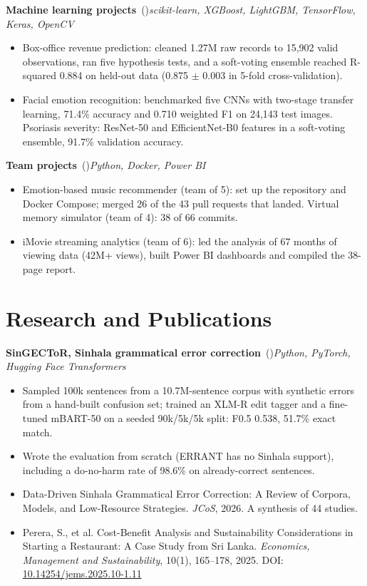 \documentclass[10pt,a4paper]{article}
\newcommand{\project}[3]{%
  \textbf{#1}\ifx\relax#3\relax\else\ (#3)\fi\hfill{\itshape #2}\par
}
\begin{document}
\project{Machine learning projects}{scikit-learn, XGBoost, LightGBM, TensorFlow, Keras, OpenCV}{}
\begin{itemize}
  \item Box-office revenue prediction: cleaned 1.27M raw records to 15,902 valid observations, ran five hypothesis tests, and a soft-voting ensemble reached R-squared 0.884 on held-out data (0.875 $\pm$ 0.003 in 5-fold cross-validation).
  \item Facial emotion recognition: benchmarked five CNNs with two-stage transfer learning, 71.4\% accuracy and 0.710 weighted F1 on 24,143 test images. Psoriasis severity: ResNet-50 and EfficientNet-B0 features in a soft-voting ensemble, 91.7\% validation accuracy.
\end{itemize}
\project{Team projects}{Python, Docker, Power BI}{}
\begin{itemize}
  \item Emotion-based music recommender (team of 5): set up the repository and Docker Compose; merged 26 of the 43 pull requests that landed. Virtual memory simulator (team of 4): 38 of 66 commits.
  \item iMovie streaming analytics (team of 6): led the analysis of 67 months of viewing data (42M+ views), built Power BI dashboards and compiled the 38-page report.
\end{itemize}

\section{Research and Publications}
\project{SinGECToR, Sinhala grammatical error correction}{Python, PyTorch, Hugging Face Transformers}{}
\begin{itemize}
  \item Sampled 100k sentences from a 10.7M-sentence corpus with synthetic errors from a hand-built confusion set; trained an XLM-R edit tagger and a fine-tuned mBART-50 on a seeded 90k/5k/5k split: F0.5 0.538, 51.7\% exact match.
  \item Wrote the evaluation from scratch (ERRANT has no Sinhala support), including a do-no-harm rate of 98.6\% on already-correct sentences.
\end{itemize}
\begin{itemize}
  \item Data-Driven Sinhala Grammatical Error Correction: A Review of Corpora, Models, and Low-Resource Strategies. \textit{JCoS}, 2026. A synthesis of 44 studies.
  \item Perera, S., et al. Cost-Benefit Analysis and Sustainability Considerations in Starting a Restaurant: A Case Study from Sri Lanka. \textit{Economics, Management and Sustainability}, 10(1), 165--178, 2025. DOI: \href{https://doi.org/10.14254/jems.2025.10-1.11}{10.14254/jems.2025.10-1.11}
\end{itemize}
\end{document}
